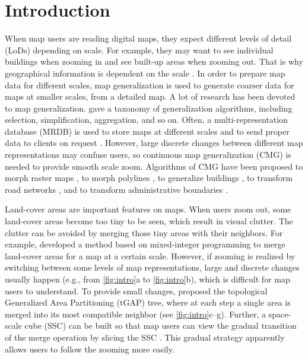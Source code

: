 \documentclass[ijgi,article,submit,moreauthors,pdftex]{Definitions/mdpi}
\begin{document}



\section{Introduction}


When map users are reading digital maps,
they expect different levels of detail (LoDs) depending on scale.
For example, they may want to see individual buildings when zooming in
and see built-up areas when zooming out.
That is why geographical information is dependent on the scale
\citep{Muller1995Generalization,Weibel1997}. 
In order to prepare map data for different scales,
map generalization is used to generate coarser data 
for maps at smaller scales,
from a detailed map.
A lot of research has been devoted to map generalization.
\citet{Mackaness2017Generalization} gave a taxonomy of 
generalization algorithms, 
including selection, simplification, aggregation, and so on.
Often, a multi-representation database (MRDB) is used to store
maps at different scales and to send proper data to clients on request
\citep[\eg][]{Hampe2004multiple}.
However, large discrete changes between different map representations
may confuse users,
so continuous map generalization (CMG) is needed to
provide smooth scale zoom.
Algorithms of CMG have been proposed 
to morph raster maps
\citep[\eg][]{Pantazis2009a,Pantazis2009b}, 
to morph polylines
\citep[\eg][]{Noellenburg2008,Peng2013LSA,Deng2015,Li2017Annealing},
to generalize buildings
\citep[\eg][]{Li2017_Building,Peng2017Building,Touya2017Progressive},
to transform road networks
\citep[\eg][]{Suba2016Road,Chimani2014Eat},
and to transform administrative boundaries
\citep[\eg][]{Peng2016Admin}.


Land-cover areas are important features on maps. 
When users zoom out,
some land-cover areas become too tiny to be seen,
which result in visual clutter.
The clutter can be avoided by merging those tiny areas 
with their neighbors.
For example, \citet{haunert2008f} developed a method based on
mixed-integer programming to merge land-cover areas
for a map at a certain scale.
However, if zooming is realized by switching between
some levels of map representations, 
large and discrete changes usually happen
(e.g., from \fig\ref{fig:intro}a to \fig\ref{fig:intro}b), 
which is difficult for map users to understand.
To provide small changes, 
\citet{vanOosterom2005} proposed 
the topological Generalized Area Partitioning (tGAP) tree,
where at each step a single area is merged into
its most compatible neighbor 
(see \fig\ref{fig:intro}c--g).
Further, a space-scale cube (SSC) can be built so that 
map users can view the gradual transition of the merge operation
by slicing the SSC \citep[see][]{Meijers2020Web}.
This gradual strategy apparently allows users 
to follow the zooming more easily.
\end{document}
